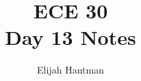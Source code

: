 \documentclass{report}
\title{\Huge{ECE 30}\\Day 13 Notes}
\author{\huge{Elijah Hantman}}
\date{}
\begin{document}
\maketitle
\newpage

\begin{description}
\end{description}
\end{document}
